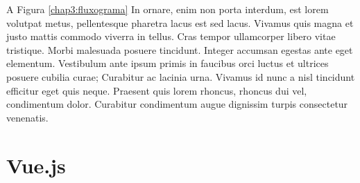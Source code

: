 \label{chap3:sec:fluxograma}

A Figura \ref{chap3:fluxograma} In ornare, enim non porta interdum, est lorem volutpat metus, pellentesque pharetra lacus est sed lacus. Vivamus quis magna et justo mattis commodo viverra in tellus. Cras tempor ullamcorper libero vitae tristique. Morbi malesuada posuere tincidunt. Integer accumsan egestas ante eget elementum. Vestibulum ante ipsum primis in faucibus orci luctus et ultrices posuere cubilia curae; Curabitur ac lacinia urna. Vivamus id nunc a nisl tincidunt efficitur eget quis neque. Praesent quis lorem rhoncus, rhoncus dui vel, condimentum dolor. Curabitur condimentum augue dignissim turpis consectetur venenatis.

\section{Vue.js}
